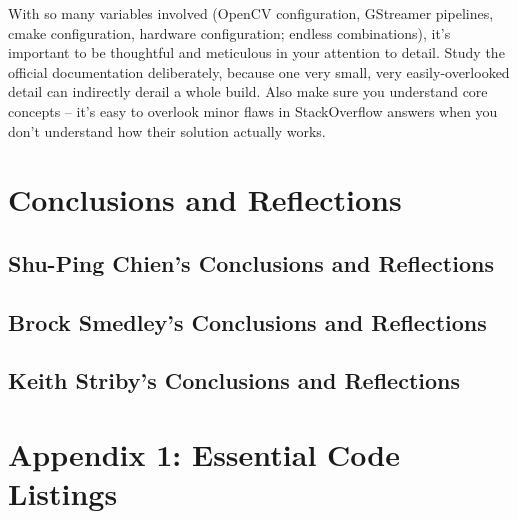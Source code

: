 \documentclass[letterpaper,10pt,serif,draftclsnofoot,onecolumn,compsoc,titlepage]{IEEEtran}
\begin{document}
With so many variables involved (OpenCV configuration, GStreamer pipelines, cmake configuration, hardware configuration; endless combinations), it's important to be thoughtful and meticulous in your attention to detail. Study the official documentation deliberately, because one very small, very easily-overlooked detail can indirectly derail a whole build. Also make sure you understand core concepts -- it's easy to overlook minor flaws in StackOverflow answers when you don't understand how their solution actually works.

\newpage

\section{Conclusions and Reflections}

	\subsection{Shu-Ping Chien's Conclusions and Reflections}

		

	\newpage

	\subsection{Brock Smedley's Conclusions and Reflections}

		

	\newpage
	
	\subsection{Keith Striby's Conclusions and Reflections}

		

	\newpage

\section{Appendix 1: Essential Code Listings}


\nocite{*}
\newpage


\end{document}
